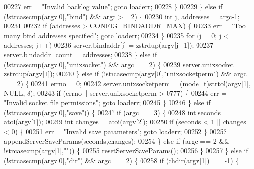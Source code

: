 \begin{DoxyCode}
00227                 err = \textcolor{stringliteral}{"Invalid backlog value"}; \textcolor{keywordflow}{goto} loaderr;
00228             \}
00229         \} \textcolor{keywordflow}{else} \textcolor{keywordflow}{if} (!strcasecmp(argv[0],\textcolor{stringliteral}{"bind"}) && argc >= 2) \{
00230             \textcolor{keywordtype}{int} j, addresses = argc-1;
00231 
00232             \textcolor{keywordflow}{if} (addresses > \hyperlink{server_8h_a314d02fcabccac3e59ecaa9d34f0d597}{CONFIG\_BINDADDR\_MAX}) \{
00233                 err = \textcolor{stringliteral}{"Too many bind addresses specified"}; \textcolor{keywordflow}{goto} loaderr;
00234             \}
00235             \textcolor{keywordflow}{for} (j = 0; j < addresses; j++)
00236                 server.bindaddr[j] = zstrdup(argv[j+1]);
00237             server.bindaddr\_count = addresses;
00238         \} \textcolor{keywordflow}{else} \textcolor{keywordflow}{if} (!strcasecmp(argv[0],\textcolor{stringliteral}{"unixsocket"}) && argc == 2) \{
00239             server.unixsocket = zstrdup(argv[1]);
00240         \} \textcolor{keywordflow}{else} \textcolor{keywordflow}{if} (!strcasecmp(argv[0],\textcolor{stringliteral}{"unixsocketperm"}) && argc == 2) \{
00241             errno = 0;
00242             server.unixsocketperm = (mode\_t)strtol(argv[1], NULL, 8);
00243             \textcolor{keywordflow}{if} (errno || server.unixsocketperm > 0777) \{
00244                 err = \textcolor{stringliteral}{"Invalid socket file permissions"}; \textcolor{keywordflow}{goto} loaderr;
00245             \}
00246         \} \textcolor{keywordflow}{else} \textcolor{keywordflow}{if} (!strcasecmp(argv[0],\textcolor{stringliteral}{"save"})) \{
00247             \textcolor{keywordflow}{if} (argc == 3) \{
00248                 \textcolor{keywordtype}{int} seconds = atoi(argv[1]);
00249                 \textcolor{keywordtype}{int} changes = atoi(argv[2]);
00250                 \textcolor{keywordflow}{if} (seconds < 1 || changes < 0) \{
00251                     err = \textcolor{stringliteral}{"Invalid save parameters"}; \textcolor{keywordflow}{goto} loaderr;
00252                 \}
00253                 appendServerSaveParams(seconds,changes);
00254             \} \textcolor{keywordflow}{else} \textcolor{keywordflow}{if} (argc == 2 && !strcasecmp(argv[1],\textcolor{stringliteral}{""})) \{
00255                 resetServerSaveParams();
00256             \}
00257         \} \textcolor{keywordflow}{else} \textcolor{keywordflow}{if} (!strcasecmp(argv[0],\textcolor{stringliteral}{"dir"}) && argc == 2) \{
00258             \textcolor{keywordflow}{if} (chdir(argv[1]) == -1) \{

\end{DoxyCode}
